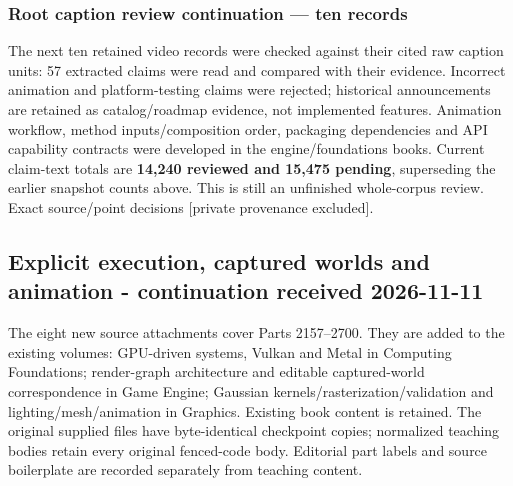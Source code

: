 \subsubsection{Root caption review continuation --- ten records}\label{appendix-3b67654799a2-root-caption-review-continuation-ten-records}

The next ten retained video records were checked against their cited raw caption units: 57 extracted claims were read and compared with their evidence. Incorrect animation and platform-testing claims were rejected; historical announcements are retained as catalog/roadmap evidence, not implemented features. Animation workflow, method inputs/composition order, packaging dependencies and API capability contracts were developed in the engine/foundations books. Current claim-text totals are \textbf{14,240 reviewed and 15,475 pending}, superseding the earlier snapshot counts above. This is still an unfinished whole-corpus review. {Exact source/point decisions {[}private provenance excluded{]}}.

\subsection{Explicit execution, captured worlds and animation - continuation received 2026-11-11}\label{appendix-3b67654799a2-explicit-execution-captured-worlds-and-animation---continuation-received-2026-11-11}

The eight new source attachments cover Parts 2157--2700. They are added to the existing volumes: GPU-driven systems, Vulkan and Metal in Computing Foundations; render-graph architecture and editable captured-world correspondence in Game Engine; Gaussian kernels/rasterization/validation and lighting/mesh/animation in Graphics. Existing book content is retained. The original supplied files have byte-identical checkpoint copies; normalized teaching bodies retain every original fenced-code body. Editorial part labels and source boilerplate are recorded separately from teaching content.


